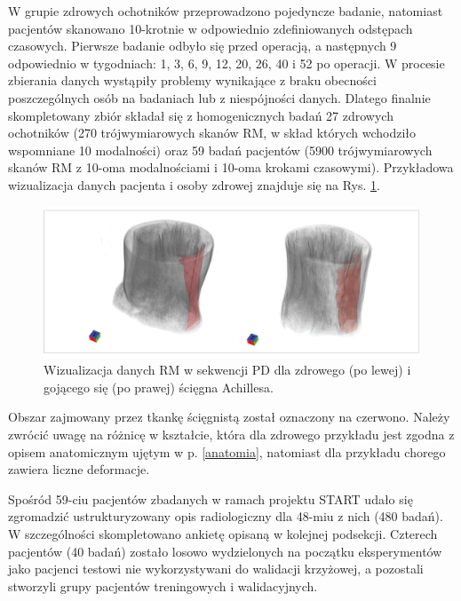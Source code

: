 W grupie zdrowych ochotników przeprowadzono pojedyncze badanie, natomiast pacjentów skanowano 10-krotnie w odpowiednio zdefiniowanych odstępach czasowych. Pierwsze badanie odbyło się przed operacją, a następnych 9 odpowiednio \linebreak w tygodniach: 1, 3, 6, 9, 12, 20, 26, 40 i 52 po operacji. W procesie zbierania danych wystąpiły problemy wynikające z braku obecności poszczególnych osób na badaniach lub z niespójności danych. Dlatego finalnie skompletowany zbiór składał się z homogenicznych badań 27 zdrowych ochotników (270 trójwymiarowych skanów RM, w skład których wchodziło wspomniane 10 modalności) oraz 59 badań pacjentów (5900 trójwymiarowych skanów RM z 10-oma modalnościami i 10-oma krokami czasowymi). Przykładowa wizualizacja danych pacjenta i osoby zdrowej znajduje się na Rys. \ref{fig:MRI_sample}. 
\begin{figure}[h!]
	\includegraphics[width=\textwidth]{figures/Data_MRI_sample.jpg}
	\caption{Wizualizacja danych RM w sekwencji PD dla zdrowego (po lewej) i gojącego się (po prawej) ścięgna Achillesa.}
	 \label{fig:MRI_sample}
\end{figure}
Obszar zajmowany przez tkankę ścięgnistą został oznaczony na czerwono. Należy zwrócić uwagę na różnicę w kształcie, która dla zdrowego przykładu jest zgodna z opisem anatomicznym ujętym w p. \ref{anatomia}, natomiast dla przykładu chorego zawiera liczne deformacje. 

Spośród 59-ciu pacjentów zbadanych w ramach projektu START udało się zgromadzić ustrukturyzowany opis radiologiczny dla 48-miu z nich (480 badań). \linebreak W szczególności skompletowano ankietę opisaną w kolejnej podsekcji. Czterech pacjentów (40 badań) zostało losowo wydzielonych na początku eksperymentów jako pacjenci testowi nie wykorzystywani do walidacji krzyżowej, a pozostali stworzyli grupy pacjentów treningowych i walidacyjnych.

